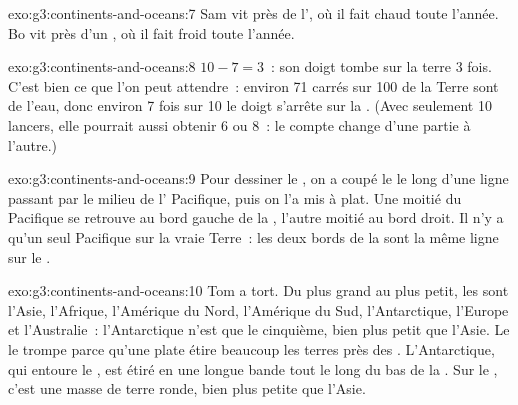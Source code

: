 \begin{solution}{exo:g3:continents-and-oceans:7}
Sam vit près de l', où il fait chaud toute l'année. Bo vit près
d'un , où il fait froid toute l'année.
\end{solution}

\begin{solution}{exo:g3:continents-and-oceans:8}
$10 - 7 = 3$~: son doigt tombe sur la terre 3 fois. C'est bien ce que l'on
peut attendre~: environ 71 carrés sur 100 de la Terre sont de l'eau, donc
environ 7 fois sur 10 le doigt s'arrête sur la . (Avec seulement
10 lancers, elle pourrait aussi obtenir 6 ou 8~: le compte change d'une
partie à l'autre.)
\end{solution}

\begin{solution}{exo:g3:continents-and-oceans:9}
Pour dessiner le , on a coupé le  le long d'une ligne
passant par le milieu de l' Pacifique, puis on l'a mis à plat. Une
moitié du Pacifique se retrouve au bord gauche de la , l'autre moitié
au bord droit. Il n'y a qu'un seul  Pacifique sur la vraie Terre~: les
deux bords de la  sont la même ligne sur le .
\end{solution}

\begin{solution}{exo:g3:continents-and-oceans:10}
Tom a tort. Du plus grand au plus petit, les  sont l'Asie,
l'Afrique, l'Amérique du Nord, l'Amérique du Sud, l'Antarctique, l'Europe
et l'Australie~: l'Antarctique n'est que le cinquième, bien plus petit que
l'Asie. Le  le trompe parce qu'une  plate étire beaucoup
les terres près des . L'Antarctique, qui entoure le , est
étiré en une longue bande tout le long du bas de la . Sur le ,
c'est une masse de terre ronde, bien plus petite que l'Asie.
\end{solution}
